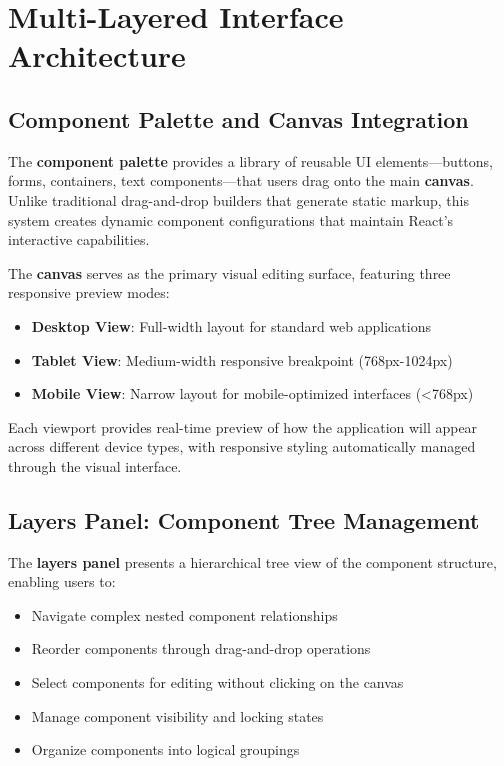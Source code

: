 \documentclass[oneside,11pt]{book}
\begin{document}
\section{Multi-Layered Interface Architecture}
\label{sec:interface-architecture}

\subsection{Component Palette and Canvas Integration}

The \textbf{component palette} provides a library of reusable UI elements—buttons, forms, containers, text components—that users drag onto the main \textbf{canvas}. Unlike traditional drag-and-drop builders that generate static markup, this system creates dynamic component configurations that maintain React's interactive capabilities.

The \textbf{canvas} serves as the primary visual editing surface, featuring three responsive preview modes:

\begin{itemize}
    \item \textbf{Desktop View}: Full-width layout for standard web applications
    \item \textbf{Tablet View}: Medium-width responsive breakpoint (768px-1024px)
    \item \textbf{Mobile View}: Narrow layout for mobile-optimized interfaces (<768px)
\end{itemize}

Each viewport provides real-time preview of how the application will appear across different device types, with responsive styling automatically managed through the visual interface.

\subsection{Layers Panel: Component Tree Management}

The \textbf{layers panel} presents a hierarchical tree view of the component structure, enabling users to:

\begin{itemize}
    \item Navigate complex nested component relationships
    \item Reorder components through drag-and-drop operations
    \item Select components for editing without clicking on the canvas
    \item Manage component visibility and locking states
    \item Organize components into logical groupings
\end{itemize}
\end{document}
